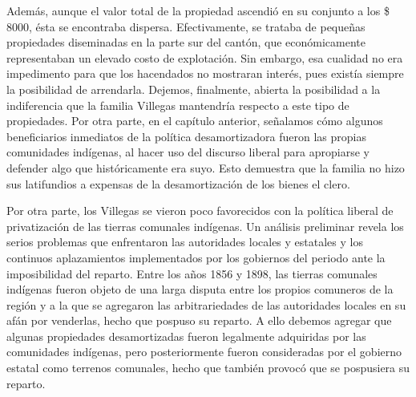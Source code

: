\documentclass[14pt,twoside,final]{extbook} %
\begin{document}
Además, aunque el valor total de la propiedad ascendió en su conjunto a los \$\,8000, ésta se encontraba dispersa. Efectivamente, se trataba de pequeñas propiedades diseminadas en la parte sur del cantón, que económicamente representaban un elevado costo de explotación. Sin embargo, esa cualidad no era impedimento para que los hacendados no mostraran interés, pues existía siempre la posibilidad de arrendarla. Dejemos, finalmente, abierta la posibilidad a la indiferencia que la familia Villegas mantendría respecto a este tipo de propiedades. Por otra parte, en el capítulo anterior, señalamos cómo algunos beneficiarios inmediatos de la política desamortizadora fueron las propias comunidades indígenas, al hacer uso del discurso liberal para apropiarse y defender algo que históricamente era suyo. Esto demuestra que la familia no hizo sus latifundios a expensas de la desamortización de los bienes el clero.

Por otra parte, los Villegas se vieron poco favorecidos con la política liberal de privatización de las tierras comunales indígenas. Un análisis preliminar revela los serios problemas que enfrentaron las autoridades locales y estatales y los continuos aplazamientos implementados por los gobiernos del periodo ante la imposibilidad del reparto. Entre los años 1856 y 1898, las tierras comunales indígenas fueron objeto de una larga disputa entre los propios comuneros de la región y a la que se agregaron las arbitrariedades de las autoridades locales en su afán por venderlas, hecho que pospuso su reparto. A ello debemos agregar que algunas propiedades desamortizadas fueron legalmente adquiridas por las comunidades indígenas, pero posteriormente fueron consideradas por el gobierno estatal como terrenos comunales, hecho que también provocó que se pospusiera su reparto.\protect\enlargethispage*{\baselineskip}
\end{document}
